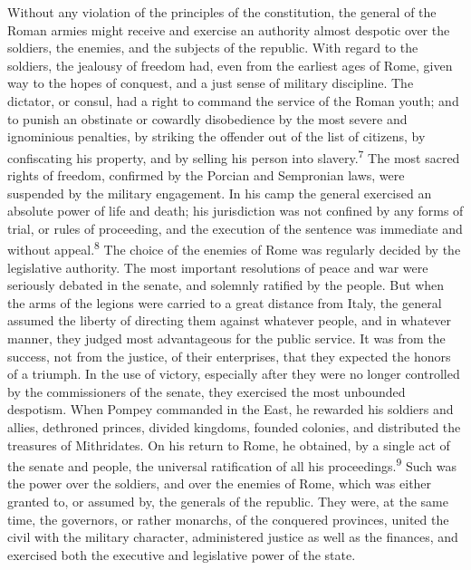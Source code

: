 Without any violation of the principles of the constitution, the
general of the Roman armies might receive and exercise an
authority almost despotic over the soldiers, the enemies, and the
subjects of the republic. With regard to the soldiers, the
jealousy of freedom had, even from the earliest ages of Rome,
given way to the hopes of conquest, and a just sense of military
discipline. The dictator, or consul, had a right to command the
service of the Roman youth; and to punish an obstinate or
cowardly disobedience by the most severe and ignominious
penalties, by striking the offender out of the list of citizens,
by confiscating his property, and by selling his person into
slavery.\textsuperscript{7} The most sacred rights of freedom, confirmed by the
Porcian and Sempronian laws, were suspended by the military
engagement. In his camp the general exercised an absolute power
of life and death; his jurisdiction was not confined by any forms
of trial, or rules of proceeding, and the execution of the
sentence was immediate and without appeal.\textsuperscript{8} The choice of the
enemies of Rome was regularly decided by the legislative
authority. The most important resolutions of peace and war were
seriously debated in the senate, and solemnly ratified by the
people. But when the arms of the legions were carried to a great
distance from Italy, the general assumed the liberty of directing
them against whatever people, and in whatever manner, they judged
most advantageous for the public service. It was from the
success, not from the justice, of their enterprises, that they
expected the honors of a triumph. In the use of victory,
especially after they were no longer controlled by the
commissioners of the senate, they exercised the most unbounded
despotism. When Pompey commanded in the East, he rewarded his
soldiers and allies, dethroned princes, divided kingdoms, founded
colonies, and distributed the treasures of Mithridates. On his
return to Rome, he obtained, by a single act of the senate and
people, the universal ratification of all his proceedings.\textsuperscript{9} Such
was the power over the soldiers, and over the enemies of Rome,
which was either granted to, or assumed by, the generals of the
republic. They were, at the same time, the governors, or rather
monarchs, of the conquered provinces, united the civil with the
military character, administered justice as well as the finances,
and exercised both the executive and legislative power of the
state.


